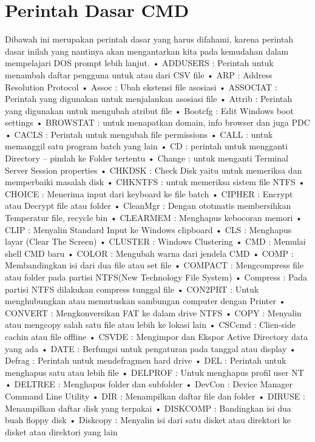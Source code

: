\documentclass{article}
\begin{document}
\section{Perintah Dasar CMD}
Dibawah ini merupakan perintah dasar yang harus difahami, karena perintah dasar inilah yang nantinya akan mengantarkan kita pada kemudahan dalam mempelajari DOS prompt lebih lanjut.
• ADDUSERS : Perintah untuk menambah  daftar pengguna untuk atau dari CSV file  
• ARP : Address Resolution Protocol  
• Assoc : Ubah ekstensi file  asosiasi  
• ASSOCIAT : Perintah yang digunakan untuk menjalankan asosiasi file  
• Attrib : Perintah yang digunakan untuk mengubah atribut file  
• Bootcfg : Edit Windows boot settings  
• BROWSTAT : untuk menapatkan domain, info browser dan juga PDC  
• CACLS : Perintah untuk mengubah file permissions  
• CALL : untuk memanggil satu program batch yang lain  
• CD : perintah untuk mengganti Directory – pindah ke Folder tertentu  
• Change : untuk menganti Terminal Server Session properties  
• CHKDSK : Check Disk yaitu untuk memeriksa dan memperbaiki masalah disk  
• CHKNTFS : untuk memeriksa sistem file NTFS  
• CHOICE : Menerima input dari keyboard ke file batch  
• CIPHER : Encrypt atau Decrypt file atau folder  
• CleanMgr : Dengan ototmatis membersihkan Temperatur file, recycle bin  
• CLEARMEM : Menghapus kebocoran memori  
• CLIP : Menyalin Standard Input ke Windows clipboard  
• CLS : Menghapus layar (Clear The Screen)  
• CLUSTER : Windows Clustering  
• CMD : Memulai shell CMD baru  
• COLOR : Mengubah warna dari jendela CMD  
• COMP : Membandingkan isi dari dua file atau set file  
• COMPACT : Mengcompress file atau folder pada partisi NTFS(New Technology File System)  
• Compress : Pada partisi NTFS dilakukan compress tunggal file  
• CON2PRT : Untuk menghubungkan atau memutuskan sambungan computer dengan Printer  
• CONVERT : Mengkonversikan FAT ke dalam drive NTFS  
• COPY : Menyalin atau mengcopy salah satu file atau lebih ke lokasi lain  
• CSCcmd : Clien-side cachin atau file offline  
• CSVDE : Mengimpor dan Ekspor Active Directory data yang ada  
• DATE : Berfungsi untuk pengaturan pada tanggal atau display  
• Defrag : Perintah untuk mendefragmen hard drive  
• DEL : Perintah untuk menghapus satu atau lebih file  
• DELPROF : Untuk menghapus  profil user NT  
• DELTREE : Menghapus folder dan  subfolder  
• DevCon : Device Manager Command Line Utility  
• DIR : Menampilkan daftar file dan folder  
• DIRUSE : Menampilkan daftar disk yang terpakai  
• DISKCOMP : Bandingkan  isi dua buah floppy disk  
• Diskcopy : Menyalin isi dari satu disket atau direktori ke disket atau direktori yang lain  
\end{document}
